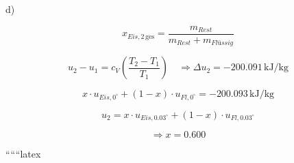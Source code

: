 d)

\[
x_{Eis,2 \, \text{ges}} = \frac{m_{Rest}}{m_{Rest} + m_{Flüssig}}
\]

\[
u_2 - u_1 = c_V \left( \frac{T_2 - T_1}{T_1} \right) \quad \Rightarrow \Delta u_2 = -200.091 \, \text{kJ/kg}
\]

\[
x \cdot u_{Eis,0^\circ} + (1 - x) \cdot u_{Fl,0^\circ} = -200.093 \, \text{kJ/kg}
\]

\[
u_2 = x \cdot u_{Eis,0.03^\circ} + (1 - x) \cdot u_{Fl,0.03^\circ}
\]

\[
\Rightarrow x = 0.600
\]

``````latex